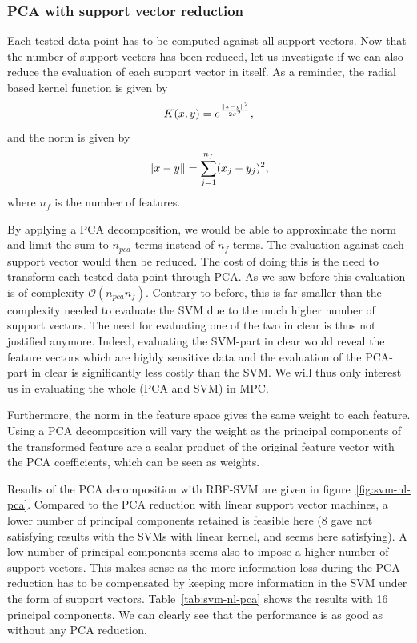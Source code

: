 \subsubsection{PCA with support vector reduction}
Each tested data-point has to be computed against all support vectors. Now that the number of support vectors has been reduced, let us investigate if we can also reduce the evaluation of each support vector in itself. As a reminder, the radial based kernel function is given by
\begin{equation}
    K(x,y) = e^{\frac{\left\lVert x-y\right\rVert^2}{2\sigma^2}},
\end{equation}
and the norm is given by
\begin{equation}
    \left\lVert x-y\right\rVert = \sum_{j=1}^{n_f} (x_j - y_j)^2,
\end{equation}
where $n_f$ is the number of features.

By applying a PCA decomposition, we would be able to approximate the norm and limit the sum to $n_{pca}$ terms instead of $n_f$ terms. The evaluation against each support vector would then be reduced. The cost of doing this is the need to transform each tested data-point through PCA. As we saw before this evaluation is of complexity $\mathcal{O}(n_{pca}n_f)$.  Contrary to before, this is far smaller than the complexity needed to evaluate the SVM due to the much higher number of support vectors. The need for evaluating one of the two in clear is thus not justified anymore. Indeed, evaluating the SVM-part in clear would reveal the feature vectors which are highly sensitive data and the evaluation of the PCA-part in clear is significantly less costly than the SVM. We will thus only interest us in evaluating the whole (PCA and SVM) in MPC.

Furthermore, the norm in the feature space gives the same weight to each feature. Using a PCA decomposition will vary the weight as the principal components of the transformed feature are a scalar product of the original feature vector with the PCA coefficients, which can be seen as weights. 

Results of the PCA decomposition with RBF-SVM are given in figure~\ref{fig:svm-nl-pca}. Compared to the PCA reduction with linear support vector machines, a lower number of principal components retained is feasible here (8 gave not satisfying results with the SVMs with linear kernel, and seems here satisfying). A low number of principal components seems also to impose a higher number of support vectors. This makes sense as the more information loss during the PCA reduction has to be compensated by keeping more information in the SVM under the form of support vectors. Table~\ref{tab:svm-nl-pca} shows the results with 16 principal components. We can clearly see that the performance is as good as without any PCA reduction.

